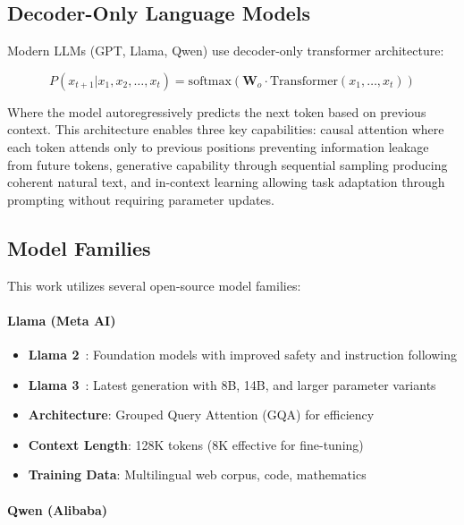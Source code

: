 \subsection{Decoder-Only Language Models}

Modern LLMs (GPT, Llama, Qwen) use decoder-only transformer architecture:

\begin{equation}
P(x_{t+1} | x_1, x_2, \ldots, x_t) = \text{softmax}(\mathbf{W}_o \cdot \text{Transformer}(x_1, \ldots, x_t))
\end{equation}

Where the model autoregressively predicts the next token based on previous context. This architecture enables three key capabilities: causal attention where each token attends only to previous positions preventing information leakage from future tokens, generative capability through sequential sampling producing coherent natural text, and in-context learning allowing task adaptation through prompting without requiring parameter updates.

\subsection{Model Families}

This work utilizes several open-source model families:

\paragraph{Llama (Meta AI)}

\begin{itemize}[leftmargin=1.2em]
  \item \textbf{Llama 2}~\cite{touvron2023llama}: Foundation models with improved safety and instruction following
  \item \textbf{Llama 3}~\cite{dubey2024llama}: Latest generation with 8B, 14B, and larger parameter variants
  \item \textbf{Architecture}: Grouped Query Attention (GQA) for efficiency
  \item \textbf{Context Length}: 128K tokens (8K effective for fine-tuning)
  \item \textbf{Training Data}: Multilingual web corpus, code, mathematics
\end{itemize}

\paragraph{Qwen (Alibaba)}

